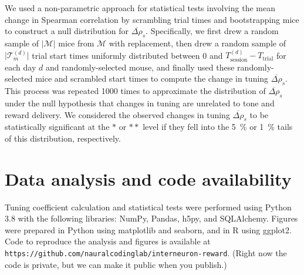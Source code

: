 \documentclass{article}
\begin{document}
We used a non-parametric approach for statistical tests involving the mean
change in Spearman correlation by scrambling trial times and bootstrapping mice
to construct a null distribution for $\overline{\Delta\rho}_{s}$. Specifically,
we first drew a random sample of $\lvert \mathcal{M} \rvert$ mice from
$\mathcal{M}$ with replacement, then drew a random sample of $\lvert
\mathcal{T}_m^{(d)} \rvert$ trial start times uniformly distributed between 0
and $T_\text{session}^{(d)} - T_\text{trial}$ for each day $d$ and
randomly-selected mouse, and finally used these randomly-selected mice and
scrambled start times to compute the change in tuning
$\overline{\Delta\rho}_{s}$. This process was repeated 1000 times to approximate
the distribution of $\overline{\Delta\rho}_{s}$ under the null hypothesis that
changes in tuning are unrelated to tone and reward delivery. We considered the
observed changes in tuning $\overline{\Delta\rho}_{s}$ to be statistically
significant at the $*$ or $**$ level if they fell into the \SI{5}{\percent} or
\SI{1}{\percent} tails of this distribution, respectively.

\section{Data analysis and code availability}

Tuning coefficient calculation and statistical tests were performed using Python
3.8 with the following libraries: NumPy, Pandas, h5py, and SQLAlchemy. Figures
were prepared in Python using matplotlib and seaborn, and in R using ggplot2.
Code to reproduce the analysis and figures is available at
\texttt{https://github.com/nauralcodinglab/interneuron-reward}. (Right now the
code is private, but we can make it public when you publish.)
\end{document}
